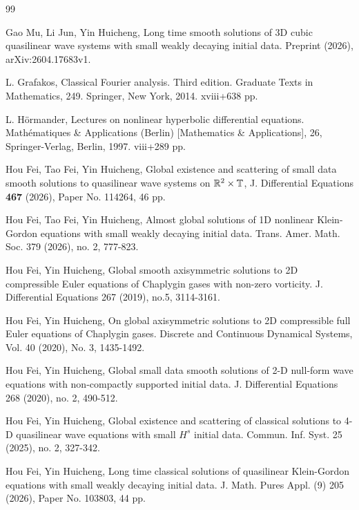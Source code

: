 \documentclass[11pt,twoside]{article}
\theoremstyle{plain}
\theoremstyle{definition}
\theoremstyle{assumption}
\numberwithin{equation}{section}
\begin{document}
\begin{thebibliography}{99}
		
		
		
		Gao Mu, Li Jun, Yin Huicheng,
		Long time smooth solutions of 3D cubic quasilinear wave systems with small weakly decaying initial data.
		Preprint (2026), arXiv:2604.17683v1.
		
		
		 L. Grafakos, Classical Fourier analysis. Third edition. Graduate Texts in Mathematics, 249.
		Springer, New York, 2014. xviii+638 pp.
		
		
		 L. H\"{o}rmander,  Lectures on nonlinear hyperbolic differential equations. Math\'ematiques \& Applications (Berlin)
		[Mathematics \& Applications], 26, Springer-Verlag, Berlin, 1997. viii+289 pp.
		
		
		
		Hou Fei, Tao Fei, Yin Huicheng, Global existence and scattering of small data smooth solutions to quasilinear wave systems on $\Bbb{R}^{2}\times \Bbb{T}$, J. Differential Equations {\bf 467} (2026), Paper No. 114264, 46 pp.

 Hou Fei, Tao Fei, Yin Huicheng, Almost global solutions of 1D nonlinear Klein-Gordon equations with small weakly decaying initial data. Trans. Amer. Math. Soc. 379 (2026), no. 2, 777-823.

 Hou Fei, Yin Huicheng, Global smooth axisymmetric solutions to 2D compressible Euler equations of
Chaplygin gases with non-zero vorticity. J. Differential Equations 267 (2019), no.5, 3114-3161.

 Hou Fei, Yin Huicheng, On global axisymmetric solutions to 2D compressible full Euler equations of Chaplygin gases.
Discrete and Continuous Dynamical Systems, Vol. 40 (2020), No. 3, 1435-1492.
		
		
		
		 Hou Fei, Yin Huicheng, Global small data smooth solutions of 2-D null-form wave equations with non-compactly supported initial data. J. Differential Equations 268 (2020), no. 2, 490-512.
		



		 Hou Fei, Yin Huicheng, Global existence and scattering of classical solutions to 4-D quasilinear wave equations with small $H^s$ initial data. Commun. Inf. Syst. 25 (2025), no. 2, 327-342.

 Hou Fei, Yin Huicheng, Long time classical solutions of quasilinear Klein-Gordon equations with small weakly decaying initial data.
 J. Math. Pures Appl. (9) 205 (2026), Paper No. 103803, 44 pp.


\end{thebibliography}
\end{document}
